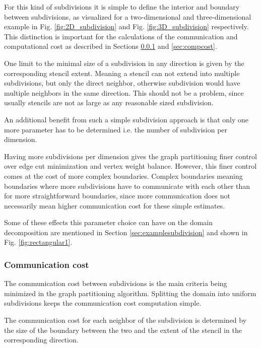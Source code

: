 For this kind of subdivisions it is simple to define the interior and boundary between subdivisions, as visualized for a two-dimensional and three-dimensional example in Fig. \ref{fig:2D_subdivision} and Fig. \ref{fig:3D_subdivision} respectively.
This distinction is important for the calculations of the communication and computational cost as described in Sections \ref{sec:commcost} and \ref{sec:compcost}.

One limit to the minimal size of a subdivision in any direction is given by the corresponding stencil extent.
Meaning a stencil can not extend into multiple subdivisions, but only the direct neighbor, otherwise subdivision would have multiple neighbors in the same direction.
This should not be a problem, since usually stencils are not as large as any reasonable sized subdivision.

An additional benefit from such a simple subdivision approach is that only one more parameter has to be determined i.e. the number of subdivision per dimension.

Having more subdivisions per dimension gives the graph partitioning finer control over edge cut minimization and vertex weight balance.
However, this finer control comes at the cost of more complex boundaries.
Complex boundaries meaning boundaries where more subdivisions have to communicate with each other than for more straightforward boundaries, since more communication does not necessarily mean higher communication cost for these simple estimates.

Some of these effects this parameter choice can have on the domain decomposition are mentioned in Section \ref{sec:examplesubdivision} and shown in Fig. \ref{fig:rectangular1}.

\subsubsection{Communication cost}
\label{sec:commcost}
The communication cost between subdivisions is the main criteria being minimized in the graph partitioning algorithm.
Splitting the domain into uniform subdivisions keeps the communication cost computation simple.

The communication cost for each neighbor of the subdivision is determined by the size of the boundary between the two and the extent of the stencil in the corresponding direction.

